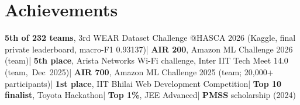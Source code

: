 \documentclass[10pt,a4paper]{article}
\newcommand{\sep}{\enspace|\enspace}
\begin{document}
\section*{Achievements}
{\raggedright{}
\textbf{5th of 232 teams}, 3rd WEAR Dataset Challenge @HASCA 2026 (Kaggle, final private leaderboard, macro-F1 0.93137)\sep
\textbf{AIR 200}, Amazon ML Challenge 2026 (team)\sep
\textbf{5th place}, Arista Networks Wi-Fi challenge, Inter IIT Tech Meet 14.0 (team,~Dec~2025)\sep
\textbf{AIR 700}, Amazon ML Challenge 2025 (team; 20,000+ participants)\sep
\textbf{1st place}, IIT Bhilai Web Development Competition\sep
\textbf{Top 10 finalist}, Toyota Hackathon\sep
\textbf{Top 1\%}, JEE Advanced\sep
\textbf{PMSS} scholarship (2024)\par}
\end{document}
